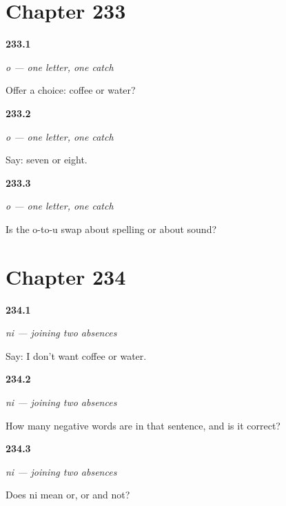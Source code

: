 \section*{Chapter 233}

\noindent\begin{minipage}[t]{\linewidth}
\raggedright
\hypertarget{review-ES-C61-o-ask}{\textbf{233.1}} \emph{o — one letter, one catch}\par
\small Offer a choice: coffee or water?
\end{minipage}\par\medskip

\noindent\begin{minipage}[t]{\linewidth}
\raggedright
\hypertarget{review-ES-C61-o-swap}{\textbf{233.2}} \emph{o — one letter, one catch}\par
\small Say: seven or eight.
\end{minipage}\par\medskip

\noindent\begin{minipage}[t]{\linewidth}
\raggedright
\hypertarget{review-ES-C61-o-why}{\textbf{233.3}} \emph{o — one letter, one catch}\par
\small Is the o-to-u swap about spelling or about sound?
\end{minipage}\par\medskip

\section*{Chapter 234}

\noindent\begin{minipage}[t]{\linewidth}
\raggedright
\hypertarget{review-ES-C61-ni-say}{\textbf{234.1}} \emph{ni — joining two absences}\par
\small Say: I don't want coffee or water.
\end{minipage}\par\medskip

\noindent\begin{minipage}[t]{\linewidth}
\raggedright
\hypertarget{review-ES-C61-ni-count}{\textbf{234.2}} \emph{ni — joining two absences}\par
\small How many negative words are in that sentence, and is it correct?
\end{minipage}\par\medskip

\noindent\begin{minipage}[t]{\linewidth}
\raggedright
\hypertarget{review-ES-C61-ni-mean}{\textbf{234.3}} \emph{ni — joining two absences}\par
\small Does ni mean or, or and not?
\end{minipage}\par\medskip

